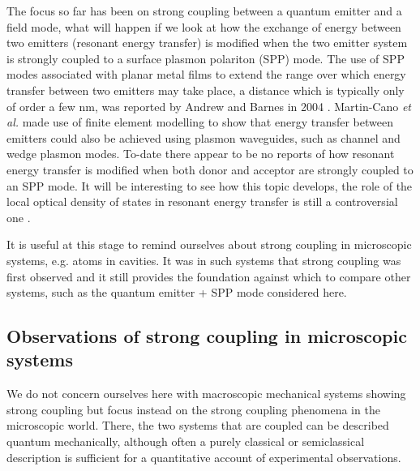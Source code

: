 \documentclass[12pt]{iopart}
\begin{document}
The focus so far has been on strong coupling between a quantum emitter and a field mode, what will happen if we look at how the exchange of energy between two emitters (resonant energy transfer) is modified when the two emitter system is strongly coupled to a surface plasmon polariton (SPP) mode. The use of SPP modes associated with planar metal films to extend the range over which energy transfer between two emitters may take place, a distance which is typically only of order a few nm, was reported by Andrew and Barnes in 2004 \cite{Andrew_Science_2004_306_1002}. Martin-Cano {\it et al.} made use of finite element modelling to show that energy transfer between emitters could also be achieved using plasmon waveguides, such as channel and wedge plasmon modes\cite{Martin-Cano_NL_2010_10_3129}.  To-date there appear to be no reports of how resonant energy transfer is modified when both donor and acceptor are strongly coupled to an SPP mode. It will be interesting to see how this topic develops, the role of the local optical density of states in resonant energy transfer is still a controversial one \cite{Andrew_Science_2000_290_785,Blum_2012_PRL_109_203601}.

It is useful at this stage to remind ourselves about strong coupling in microscopic systems, e.g. atoms in cavities. It was in such systems that strong coupling was first observed and it still provides the foundation against which to compare other systems, such as the quantum emitter + SPP mode considered here.

\subsection{Observations of strong coupling in microscopic systems}

We do not concern ourselves here with macroscopic mechanical systems showing strong coupling but focus instead on the strong coupling phenomena in the microscopic world. There, the two systems that are coupled can be described quantum mechanically, although often a purely classical or semiclassical description is sufficient for a quantitative account of experimental observations.
\end{document}
